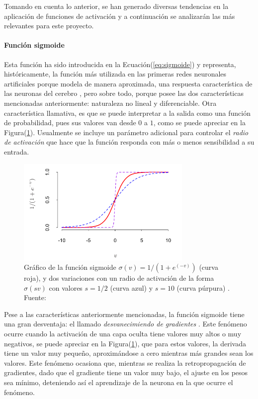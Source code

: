         Tomando en cuenta lo anterior, se han generado diversas tendencias en la aplicación de funciones de activación y a 
        continuación se analizarán las más relevantes para este proyecto.
            \paragraph{Función sigmoide}\label{sec:sigmoide}
            Esta función ha sido introducida en la Ecuación(\ref{eq:sigmoide}) y representa, históricamente, la función 
            más utilizada en las primeras redes neuronales artificiales porque modela de manera aproximada, una respuesta 
            característica de las neuronas del cerebro \cite{narayan1997generalized}, pero sobre todo, porque posee las dos características mencionadas 
            anteriormente: naturaleza no lineal y diferenciable. Otra característica llamativa, es que se puede interpretar 
            a la salida como una función de probabilidad, pues sus valores van desde $0$ a $1$, como se puede apreciar 
            en la Figura(\ref{fig:sigmoide}). Usualmente se incluye un parámetro adicional para controlar el \textit{radio de activación}
            que hace que la función responda con más o menos sensibilidad a su entrada.

            \begin{figure}[!h] 
                \centering
                \includegraphics[width=0.75\textwidth]{img/sigmoide}
                \caption[Gráfico de la función sigmoide]{Gráfico de la función sigmoide $\sigma(v) = 1 / (1 + e^{(-v)})$ (curva roja), y dos variaciones con un radio de activación de la forma $\sigma(sv)$ con valores $s=1/2$ (curva azul) y $s=10$ (curva púrpura) . Fuente: \cite{Goodfellow-et-al-2016} }
                \label{fig:sigmoide}
            \end{figure}
            
            Pese a las características anteriormente mencionadas, la función sigmoide tiene una gran desventaja: el llamado 
            \textit{desvanecimiendo de gradientes} \cite{hochreiter1998vanishing}. Este fenómeno ocurre cuando la activación 
            de una capa oculta tiene valores muy altos o muy negativos, se puede apreciar en la Figura(\ref{fig:sigmoide}), que 
            para estos valores, la derivada tiene un valor muy pequeño, aproximándose a cero mientras más grandes sean los valores.
            Este fenómeno ocasiona que, mientras se realiza la retropropagación de gradientes, dado que el gradiente tiene un valor 
            muy bajo, el ajuste en los pesos sea mínimo, deteniendo así el aprendizaje de la neurona en la que ocurre el fenómeno.

